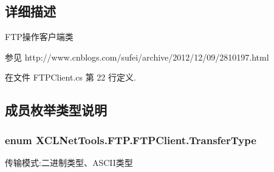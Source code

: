 \subsection{详细描述}
F\+T\+P操作客户端类 \begin{DoxySeeAlso}{参见}
http\+://www.\+cnblogs.\+com/sufei/archive/2012/12/09/2810197.\+html


\end{DoxySeeAlso}




在文件 F\+T\+P\+Client.\+cs 第 22 行定义.



\subsection{成员枚举类型说明}
\subsubsection[{\texorpdfstring{Transfer\+Type}{TransferType}}]{\setlength{\rightskip}{0pt plus 5cm}enum {\bf X\+C\+L\+Net\+Tools.\+F\+T\+P.\+F\+T\+P\+Client.\+Transfer\+Type}\hspace{0.3cm}{\ttfamily [strong]}}\hypertarget{class_x_c_l_net_tools_1_1_f_t_p_1_1_f_t_p_client_adef28404af1c916d9bd2bfbfa924b707}{}\label{class_x_c_l_net_tools_1_1_f_t_p_1_1_f_t_p_client_adef28404af1c916d9bd2bfbfa924b707}


传输模式\+:二进制类型、\+A\+S\+C\+I\+I类型 

